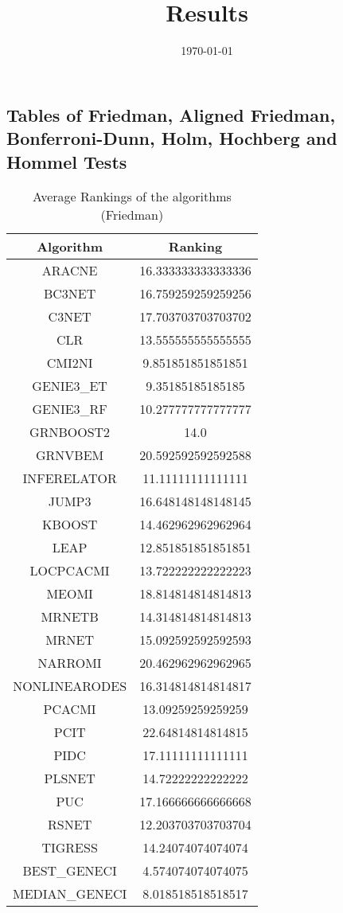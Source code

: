 \documentclass[a4paper,10pt]{article}
\title{Results}
\author{}
\date{\today}
\begin{document}
\begin{landscape}
\oddsidemargin 0in \topmargin 0in\maketitle
\section{Tables of Friedman, Aligned Friedman, Bonferroni-Dunn, Holm, Hochberg and Hommel Tests}
\begin{table}[!htp]
\centering
\caption{Average Rankings of the algorithms (Friedman)
}\begin{tabular}{c|c}
Algorithm&Ranking\\
\hline
ARACNE&16.333333333333336\\
BC3NET&16.759259259259256\\
C3NET&17.703703703703702\\
CLR&13.555555555555555\\
CMI2NI&9.851851851851851\\
GENIE3_ET&9.35185185185185\\
GENIE3_RF&10.277777777777777\\
GRNBOOST2&14.0\\
GRNVBEM&20.592592592592588\\
INFERELATOR&11.11111111111111\\
JUMP3&16.648148148148145\\
KBOOST&14.462962962962964\\
LEAP&12.851851851851851\\
LOCPCACMI&13.722222222222223\\
MEOMI&18.814814814814813\\
MRNETB&14.314814814814813\\
MRNET&15.092592592592593\\
NARROMI&20.462962962962965\\
NONLINEARODES&16.314814814814817\\
PCACMI&13.09259259259259\\
PCIT&22.64814814814815\\
PIDC&17.11111111111111\\
PLSNET&14.72222222222222\\
PUC&17.166666666666668\\
RSNET&12.203703703703704\\
TIGRESS&14.24074074074074\\
BEST_GENECI&4.574074074074075\\
MEDIAN_GENECI&8.018518518518517\\
\end{tabular}
\end{table}



\end{landscape}
\end{document}
